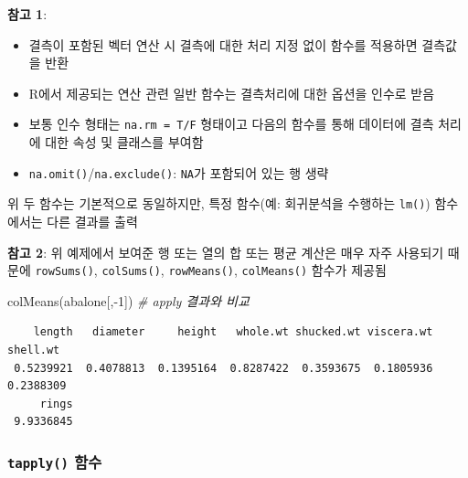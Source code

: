 \documentclass[
  11pt,
]{krantz}
\makeatletter
\newenvironment{Shaded}{\begin{snugshade}}{\end{snugshade}}
\newcommand{\CommentTok}[1]{\textcolor[rgb]{0.37,0.37,0.37}{\textit{#1}}}
\newcommand{\DecValTok}[1]{\textcolor[rgb]{0.06,0.06,0.06}{#1}}
\newcommand{\FunctionTok}[1]{\textcolor[rgb]{0,0,0}{#1}}
\newcommand{\NormalTok}[1]{#1}
\newcommand{\SpecialCharTok}[1]{\textcolor[rgb]{0,0,0}{#1}}
\providecommand{\tightlist}{%
  \setlength{\itemsep}{0pt}\setlength{\parskip}{0pt}}
\newenvironment{kframe}{%
\medskip{}
\setlength{\fboxsep}{.8em}
 \def\at@end@of@kframe{}%
 \ifinner\ifhmode%
  \def\at@end@of@kframe{\end{minipage}}%
  \begin{minipage}{\columnwidth}%
 \fi\fi%
 \def\FrameCommand##1{\hskip\@totalleftmargin \hskip-\fboxsep
 \colorbox{shadecolor}{##1}\hskip-\fboxsep
     \hskip-\linewidth \hskip-\@totalleftmargin \hskip\columnwidth}%
 \MakeFramed {\advance\hsize-\width
   \@totalleftmargin\z@ \linewidth\hsize
   \@setminipage}}%
 {\par\unskip\endMakeFramed%
 \at@end@of@kframe}
\newenvironment{rmdblock}[1]
  {
  \begin{itemize}
  \renewcommand{\labelitemi}{
    \raisebox{-.7\height}[0pt][0pt]{
      {\setkeys{Gin}{width=3em,keepaspectratio}\texttt{[image: images/\#1]}}
    }
  }
  \setlength{\fboxsep}{1em}
  \begin{kframe}
  \item
  }
  {
  \end{kframe}
  \end{itemize}
  }
\newenvironment{rmdtip}
  {\begin{rmdblock}{tip}}
  {\end{rmdblock}}
\makeatother
\begin{document}
\begin{rmdtip}
\textbf{참고 1}:

\begin{itemize}
\tightlist
\item
  결측이 포함된 벡터 연산 시 결측에 대한 처리 지정 없이 함수를 적용하면 결측값을 반환
\item
  R에서 제공되는 연산 관련 일반 함수는 결측처리에 대한 옵션을 인수로 받음
\item
  보통 인수 형태는 \texttt{na.rm\ =\ T/F} 형태이고 다음의 함수를 통해 데이터에 결측 처리에 대한 속성 및 클래스를 부여함
\item
  \texttt{na.omit()}/\texttt{na.exclude()}: \texttt{NA}가 포함되어 있는 행 생략
\end{itemize}

위 두 함수는 기본적으로 동일하지만, 특정 함수(예: 회귀분석을 수행하는 \texttt{lm()}) 함수에서는 다른 결과를 출력
\end{rmdtip}

\normalsize

\footnotesize

\begin{rmdtip}
\textbf{참고 2}: 위 예제에서 보여준 행 또는 열의 합 또는 평균 계산은 매우 자주 사용되기 때문에 \texttt{rowSums()}, \texttt{colSums()}, \texttt{rowMeans()}, \texttt{colMeans()} 함수가 제공됨
\end{rmdtip}

\normalsize

\footnotesize

\begin{Shaded}
\begin{Highlighting}[]
\FunctionTok{colMeans}\NormalTok{(abalone[,}\SpecialCharTok{{-}}\DecValTok{1}\NormalTok{]) }\CommentTok{\# apply 결과와 비교}
\end{Highlighting}
\end{Shaded}

\begin{verbatim}
    length   diameter     height   whole.wt shucked.wt viscera.wt   shell.wt 
 0.5239921  0.4078813  0.1395164  0.8287422  0.3593675  0.1805936  0.2388309 
     rings 
 9.9336845 
\end{verbatim}

\normalsize

\hypertarget{tapply-df}{%
\subsubsection*{\texorpdfstring{\texttt{tapply()} 함수}{tapply() 함수}}\label{tapply-df}}
\end{document}
